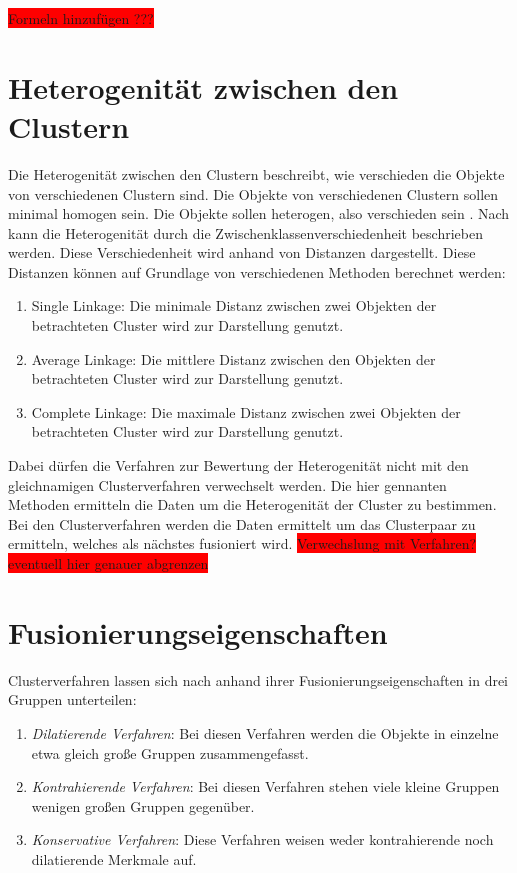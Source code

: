 \colorbox{red}{Formeln hinzufügen ???}
\section{Heterogenität zwischen den Clustern}
Die Heterogenität zwischen den Clustern beschreibt, wie verschieden die Objekte von verschiedenen Clustern sind. Die Objekte von verschiedenen Clustern sollen minimal homogen sein. Die Objekte sollen heterogen, also verschieden sein \citep[Vgl.][S. 16]{Bacher.2010}.
Nach \citet[S. 181]{Bankhofer.2008} kann die Heterogenität durch die Zwischenklassenverschiedenheit beschrieben werden. Diese Verschiedenheit wird anhand von Distanzen dargestellt. Diese Distanzen können auf Grundlage von verschiedenen Methoden berechnet werden:
\begin{enumerate}
        \item Single Linkage: Die minimale Distanz zwischen zwei Objekten der betrachteten Cluster wird zur Darstellung genutzt.
        \item Average Linkage: Die mittlere Distanz zwischen den Objekten der betrachteten Cluster wird zur Darstellung genutzt.
        \item Complete Linkage: Die maximale Distanz zwischen zwei Objekten der betrachteten Cluster wird zur Darstellung genutzt.
\end{enumerate}
Dabei dürfen die Verfahren zur Bewertung der Heterogenität nicht mit den gleichnamigen Clusterverfahren verwechselt werden. Die hier gennanten Methoden ermitteln die Daten um die Heterogenität der Cluster zu bestimmen. Bei den Clusterverfahren werden die Daten ermittelt um das Clusterpaar zu ermitteln, welches als nächstes fusioniert wird. 
\colorbox{red}{Verwechslung mit Verfahren? eventuell hier genauer abgrenzen} 

\section{Fusionierungseigenschaften}
Clusterverfahren lassen sich nach \citet[S. 488/489]{Backhaus.2016} anhand ihrer Fusionierungseigenschaften in drei Gruppen unterteilen:
\begin{enumerate}
        \item \textit{Dilatierende Verfahren}: Bei diesen Verfahren werden die Objekte in einzelne etwa gleich große Gruppen zusammengefasst.
        \item \textit{Kontrahierende Verfahren}: Bei diesen Verfahren stehen viele kleine Gruppen wenigen großen Gruppen gegenüber.
        \item \textit{Konservative Verfahren}: Diese Verfahren weisen weder kontrahierende noch dilatierende Merkmale auf.
\end{enumerate}
